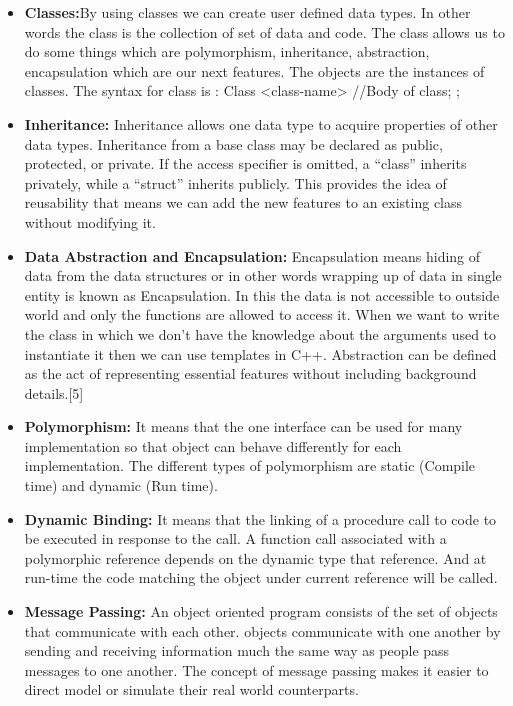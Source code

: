 \begin{itemize}
\item {\bf{Classes:}}By using classes we can create user defined data types. In other words the class is the collection of set of data and code. The class allows us to do some things which are polymorphism, inheritance, abstraction, encapsulation which are our next features. The objects are the instances of classes.
The syntax for class is :
Class <class-name>
{   
//Body of class;
};
 \item{\bf{Inheritance:}}
 Inheritance allows one data type to acquire properties of other data types. Inheritance from a base class may be declared as public, protected, or private. If the access specifier is omitted, a “class” inherits privately, while a “struct” inherits publicly. This provides the idea of reusability that means we can add the new features to an existing class without modifying it.
 
 \item{\bf{Data Abstraction and Encapsulation:}}
  Encapsulation means hiding of data from the data structures or in other words wrapping up of data in single entity is known as Encapsulation. In this the data is not accessible to outside world and only the  functions are allowed to access it.  When we want to write the class in which we don’t have the knowledge about the arguments used to instantiate it then we can use templates in C++. Abstraction can be defined as the act of representing essential features without including background details.[5]
 
 \item{\bf{Polymorphism:}}
It means that the one interface can be used for many implementation so that object can behave differently for each implementation. The different types of polymorphism are static (Compile time) and dynamic (Run time).
 
 \item{\bf{Dynamic Binding:}}
It means that the linking of a procedure call to code to be executed in response to the call. A function call associated with a polymorphic reference depends on the dynamic type that reference. And at run-time the code matching the object under current reference will be called.
 \item{\bf{Message Passing:}}
  An object oriented program consists of the set of objects that communicate with each other. objects communicate with one another by sending and receiving information much the same way as people pass messages to one another. The concept of message passing makes it easier to direct model or simulate their real world counterparts.
	
\end{itemize}

